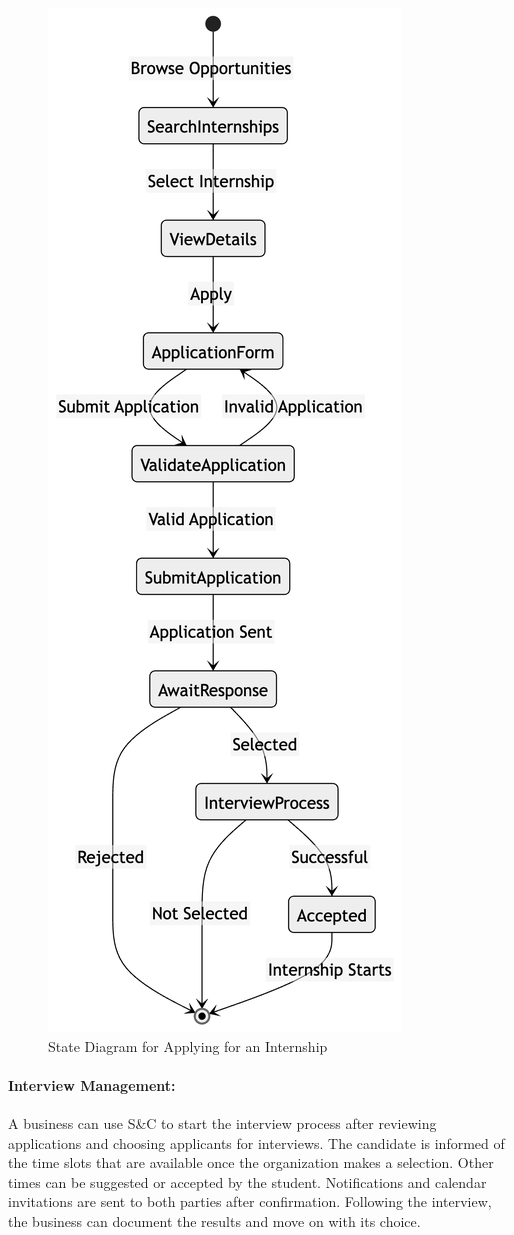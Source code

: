 \begin{figure}[H]
    \begin{center}
        \includegraphics[width=0.35\linewidth]{JhaBhatiaSharma/Images/State Diagrams/ApplyingInternship.png}
        \caption{State Diagram for Applying for an Internship}
        \label{fig:create_Battle_sd}%
    \end{center}
\end{figure}

\paragraph{Interview Management:}
A business can use S\&C to start the interview process after reviewing applications and choosing applicants for interviews. The candidate is informed of the time slots that are available once the organization makes a selection. Other times can be suggested or accepted by the student. Notifications and calendar invitations are sent to both parties after confirmation. Following the interview, the business can document the results and move on with its choice.

